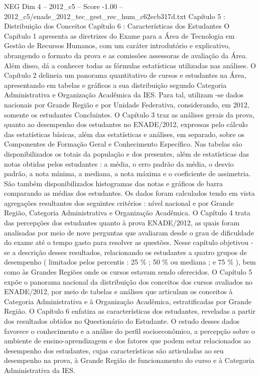 \begin{textsample}{NEG Dim 4 – 2012\_c5 – Score -1.00 – 2012\_c5/enade\_2012\_tec\_gest\_rec\_hum\_c62ecb317d.txt}  \label{ex:f4_neg_104}
Capítulo 5 : Distribuição dos Conceitos Capítulo 6 : Características dos Estudantes O Capítulo 1 apresenta as diretrizes do Exame para a Área de Tecnologia em Gestão de Recursos Humanos, com um caráter introdutório e explicativo, abrangendo o formato da prova e as comissões assessoras de avaliação da Área.
Além disso, dá a conhecer todas as fórmulas estatísticas utilizadas nas análises.
O Capítulo 2 delineia um panorama quantitativo de cursos e estudantes na Área, apresentando em tabelas e gráficos a sua distribuição segundo Categoria Administrativa e Organização Acadêmica da IES.
Para tal, utilizam -se dados nacionais por Grande Região e por Unidade Federativa, considerando, em 2012, somente os estudantes Concluintes.
O Capítulo 3 traz as análises gerais da prova, quanto ao desempenho dos estudantes no ENADE/2012, expressas pelo cálculo das estatísticas básicas, além das estatísticas e análises, em separado, sobre os Componentes de Formação Geral e Conhecimento Específico.
Nas tabelas são disponibilizados os totais da população e dos presentes, além de estatísticas das notas obtidas pelos estudantes : a média, o erro padrão da média, o desvio padrão, a nota mínima, a mediana, a nota máxima e o coeficiente de assimetria.
São também disponibilizados histogramas das notas e gráficos de barra comparando as médias dos estudantes.
Os dados foram calculados tendo em vista agregações resultantes dos seguintes critérios : nível nacional e por Grande Região, Categoria Administrativa e Organização Acadêmica.
O Capítulo 4 trata das percepções dos estudantes quanto à prova ENADE/2012, as quais foram analisadas por meio de nove perguntas que avaliaram desde o grau de dificuldade do exame até o tempo gasto para resolver as questões.
Nesse capítulo objetivou -se a descrição desses resultados, relacionando os estudantes a quatro grupos de desempenho ( limitados pelos percentis : 25 \% ; 50 \% ou mediana ; e 75 \% ), bem como às Grandes Regiões onde os cursos estavam sendo oferecidos.
O Capítulo 5 expõe o panorama nacional da distribuição dos conceitos dos cursos avaliados no ENADE/2012, por meio de tabelas e análises que articulam os conceitos à Categoria Administrativa e à Organização Acadêmica, estratificadas por Grande Região.
O Capítulo 6 enfatiza as características dos estudantes, reveladas a partir dos resultados obtidos no Questionário do Estudante.
O estudo desses dados favorece o conhecimento e a análise do perfil socioeconômico, a percepção sobre o ambiente de ensino-aprendizagem e dos fatores que podem estar relacionados ao desempenho dos estudantes, cujas características são articuladas ao seu desempenho na prova, à Grande Região de funcionamento do curso e à Categoria Administrativa da IES.

\end{textsample}
